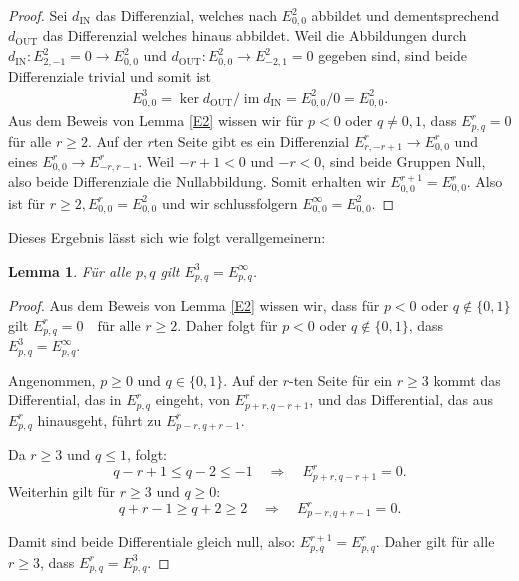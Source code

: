 \documentclass[12pt]{article}
\numberwithin{conj}{section}
\newtheorem{lemma}[conj]{Lemma}
\newcommand{\ima}{\operatorname{im}}
\begin{document}
    \begin{proof}
    Sei $d_{\operatorname{IN}}$ das Differenzial, welches nach $E^2_{0,0}$ abbildet und dementsprechend $d_{\operatorname{OUT}}$ das Differenzial welches hinaus abbildet. Weil die Abbildungen durch $d_{\operatorname{IN}}: E^{2}_{2,-1} = 0 \to E^2_{0,0}$ und $d_{\operatorname{OUT}}: E^2_{0,0} \to E^2_{-2,1} = 0$ gegeben sind, sind beide Differenziale trivial und somit ist 
    \begin{align}
    E^3_{0,0} = \ker d_{\operatorname{OUT}} / \ima d_{\operatorname{IN}} = E^2_{0,0} / 0 = E^2_{0,0}.
    \end{align}
    Aus dem Beweis von Lemma \ref{E2} wissen wir für $p<0$ oder $q \neq 0,1$, dass $E^r_{p,q} = 0$ für alle $r \geq 2$. Auf der $r$ten Seite gibt es ein Differenzial $E^r_{r,-r+1} \to E^r_{0,0}$ und eines $E^r_{0,0} \to E^r_{-r,r-1}$. Weil $-r+1 < 0$ und $-r < 0$, sind beide Gruppen Null, also beide Differenziale die Nullabbildung. Somit erhalten wir $E^{r+1}_{0,0} = E^r_{0,0}$. Also ist für $r \geq 2, E^r_{0,0} = E^2_{0,0}$ und wir schlussfolgern $E^\infty_{0,0} = E^2_{0,0}$.
    \end{proof}
    Dieses Ergebnis lässt sich wie folgt verallgemeinern:
    \begin{lemma}
    \label{E3}
    Für alle $p,q$ gilt $E^3_{p,q} = E^\infty_{p,q}$.
    \end{lemma}
    \begin{proof}
    Aus dem Beweis von Lemma \ref{E2} wissen wir, dass für \( p < 0 \) oder \( q \notin \{0,1\} \) gilt $E^r_{p,q} = 0 \quad \text{für alle } r \geq 2$. Daher folgt für \( p < 0 \) oder \( q \notin \{0,1\} \), dass $E^3_{p,q} = E^\infty_{p,q}$.

    Angenommen, \( p \geq 0 \) und \( q \in \{0,1\} \). Auf der \( r \)-ten Seite für ein \( r \geq 3 \) kommt das Differential, das in \( E^r_{p,q} \) eingeht, von \( E^r_{p+r, q-r+1} \), und das Differential, das aus \( E^r_{p,q} \) hinausgeht, führt zu \( E^r_{p-r, q+r-1} \).

    Da \( r \geq 3 \) und \( q \leq 1 \), folgt:
    \[
    q - r + 1 \leq q - 2 \leq -1 \quad \Rightarrow \quad E^r_{p+r, q-r+1} = 0.
    \]
    Weiterhin gilt für \( r \geq 3 \) und \( q \geq 0 \):
    \[
    q + r - 1 \geq q + 2 \geq 2 \quad \Rightarrow \quad E^r_{p-r, q+r-1} = 0.
    \]

    Damit sind beide Differentiale gleich null, also: $E^{r+1}_{p,q} = E^r_{p,q}$. Daher gilt für alle \( r \geq 3 \), dass $E^r_{p,q} = E^3_{p,q}$.
    \end{proof}
\end{document}
